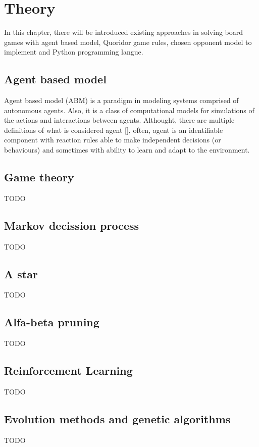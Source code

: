 \chapter{Theory}\label{chap:2}
  In this chapter, there will be introduced existing approaches in solving
board games with agent based model, Quoridor game rules, chosen opponent model
to implement and Python programming langue.

\section{Agent based model}
Agent based model (ABM) is a paradigm in modeling systems comprised
of autonomous agents. Also, it is a class of computational models for
simulations of the actions and interactions between agents. Althought, there
are multiple definitions of what is considered agent [\cite{abm}], often, agent
is an identifiable component with reaction rules able to make independent
decisions (or behaviours) and sometimes with ability to learn and adapt to
the environment.

\section{Game theory}
TODO

\section{Markov decission process}
TODO

\section{A star}
TODO

\section{Alfa-beta pruning}
TODO

\section{Reinforcement Learning}
TODO

\section{Evolution methods and genetic algorithms}
TODO

